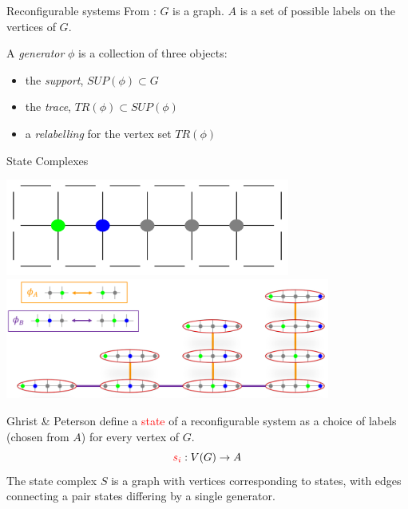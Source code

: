 \documentclass[
    a0paper, %
    portrait, %
    fontscale=0.4 %
    ]{baposter}
\begin{document}
\begin{poster}
\begin{posterbox}[
    name = config,  %
    column = 0, %
    below = grid %
    ]{Reconfigurable systems}
From \cite{Ghrist-Peterson:2007}: $G$ is a graph. $A$ is a set of possible labels on the vertices of $G$.

A \textit{generator} $\phi$ is a collection of three objects:
\begin{itemize}
    \item the \textit{support}, $SUP(\phi) \subset G$
    \item the \textit{trace}, $TR(\phi) \subset SUP(\phi)$
    \item a \textit{relabelling} for the vertex set $TR(\phi)$
\end{itemize}

 \end{posterbox}


\begin{posterbox}[
    name = sc,  %
    column = 1, %
    below = message
    ]{State Complexes}
\begin{center}
\includegraphics[width=0.7\textwidth]{coorridor.PNG}
\includegraphics[width=0.8\textwidth]{SC-example.PNG}
\end{center}

Ghrist \& Peterson \cite{Ghrist-Peterson:2007} define a \textcolor{red}{state} of a reconfigurable system as a choice of labels (chosen from $A$) for every vertex of $G$.
\vspace{0.15cm}
$$\textcolor{red}{s_i}:V(G) \rightarrow A$$
The state complex $S$ is a graph with vertices corresponding to states, with edges connecting a pair states differing by a single generator.
\end{posterbox}



\end{poster}
\end{document}
